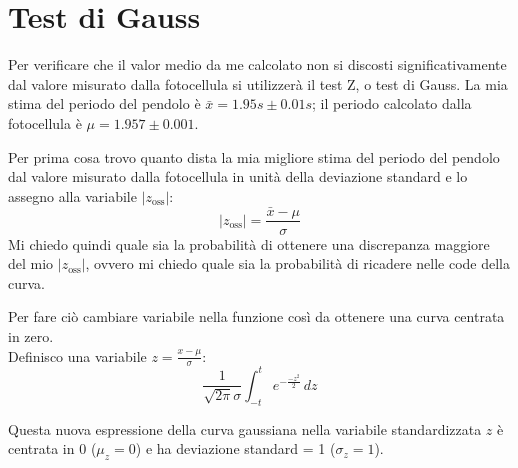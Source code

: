 \documentclass{article}
\begin{document}
	\newpage
	\section{Test di Gauss}
	Per verificare che il valor medio da me calcolato non si discosti significativamente dal valore misurato dalla fotocellula si utilizzerà il test Z, o test di Gauss. La mia stima del periodo del pendolo è $\bar{x} = 1.95s \pm 0.01 s$; il periodo calcolato dalla fotocellula è $ \mu = 1.957 \pm 0.001$. 
	
	Per prima cosa trovo quanto dista la mia migliore stima del periodo del pendolo dal valore misurato dalla fotocellula in unità della deviazione standard e lo assegno alla variabile $|z_{\text{oss}}|$:
	\[
	|z_{\text{oss}}| = \frac{\bar{x} - \mu}{\sigma}
	\]
	Mi chiedo quindi quale sia la probabilità di ottenere una discrepanza maggiore del mio $|z_{\text{oss}}|$, ovvero mi chiedo quale sia la probabilità di ricadere nelle code della curva.
	
	\noindent
	Per fare ciò cambiare variabile nella funzione così da ottenere una curva centrata in zero. \\
	
	\noindent
	Definisco una variabile $z = \frac{x-\mu}{\sigma}$:
	\[
	\frac{1}{\sqrt{2\pi}\sigma} \int_{-t}^{t}e^{-\frac{-z^2}{2}} \,dz
	\]
	
	Questa nuova espressione della curva gaussiana nella variabile standardizzata $z$ è centrata in $0$ ($\mu_z =0$) e ha deviazione standard = 1 ($\sigma_{z} = 1$).
\end{document}
